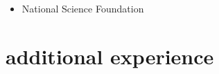 \documentclass[10pt,oneside]{article}
\begin{document}
\mbox{}\vspace{-\dimexpr\baselineskip\relax}

\begin{itemize}[label={}]
  
  \item National Science Foundation
        
\end{itemize}


\section{additional experience}

\mbox{}\vspace{-\dimexpr\baselineskip\relax}
\end{document}

